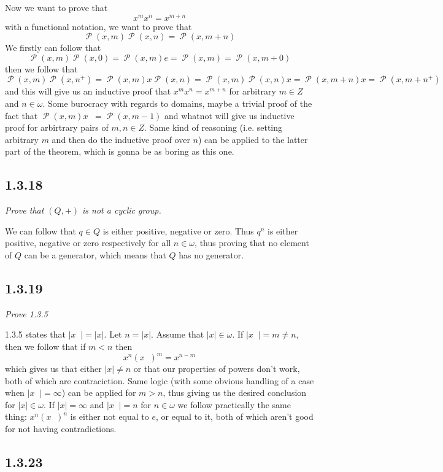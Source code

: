 \documentclass[11pt,oneside,titlepage]{book}
\DeclareMathOperator \pow {\mathcal {P}}
\DeclareMathOperator \inv {^{-1}}
\begin{document}
Now we want to prove that
$$x^m x^n = x^{m + n}$$
with a functional notation, we want to prove that
$$\pow(x, m) \pow(x, n) = \pow(x, m + n)$$
We firstly can follow that
$$\pow(x, m) \pow(x, 0) = \pow(x, m) e = \pow(x, m) = \pow(x, m + 0)$$
then we follow that
$$\pow(x, m) \pow(x, n^+) = \pow(x, m) x \pow(x, n) = \pow(x, m) \pow(x, n) x = \pow(x, m + n) x =
\pow(x, m + n^+)$$
and this will give us an inductive proof that $x^m x^n = x^{m + n}$ for arbitrary $m \in Z$ and
$n \in \omega$. Some burocracy with regards to domains, maybe a trivial proof of the
fact that $\pow(x, m) x\inv = \pow(x, m - 1)$  and whatnot will give us inductive proof for
arbirtrary pairs of $m, n \in Z$. Same kind of reasoning (i.e. setting arbitrary $m$ and
then do the inductive proof over $n$) can be applied to the latter part of the theorem,
which is gonna be as boring as this one.



\subsection*{1.3.18}

\textit{Prove that $(Q, +)$ is not a cyclic group.}

We can follow that $q \in Q$ is either positive, negative or zero. Thus $q^n$ is either positive,
negative or zero respectively for all $n \in \omega$, thus proving that no element of $Q$ can be
a generator, which means that $Q$ has no generator.

\subsection*{1.3.19}

\textit{Prove 1.3.5}

1.3.5 states that $|x\inv| = |x|$. Let $n = |x|$. Assume that $|x| \in \omega$.
If $|x\inv| = m \neq n$,
then we follow that if  $m < n$ then
$$x^n (x\inv)^m = x^{n - m}$$
which gives us that either $|x| \neq n$ or that our properties of powers don't work,
both of which are contraciction. Same logic (with some obvious handling of a case
when $|x\inv| = \infty$) can be applied for
$m > n$, thus giving us the desired conclusion for $|x| \in \omega$. If $|x| = \infty$
and $|x\inv| = n$ for $n \in \omega$ we follow practically the same thing: 
$x^n (x\inv)^n$ is either not equal to $e$, or equal to it, both of which aren't good for
not having contradictions.

\subsection*{1.3.23}
\end{document}
